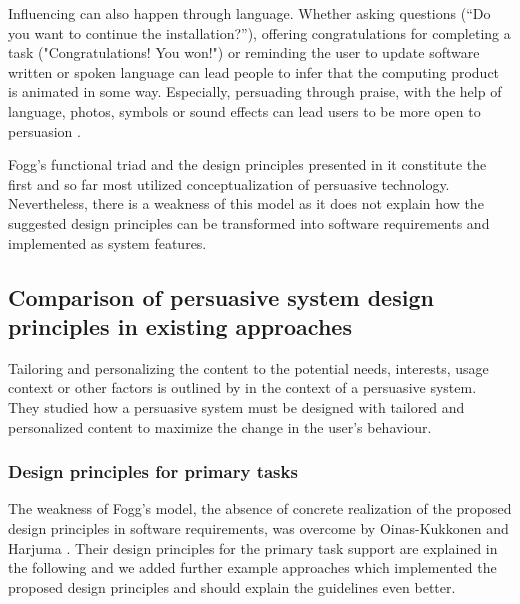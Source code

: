 Influencing can also happen through language. Whether asking questions
(“Do you want to continue the installation?”), offering congratulations for
completing a task ("Congratulations! You won!") or reminding the user to update software written or spoken language can lead people to infer that the computing product is animated in some way. Especially, persuading through praise, with the help of language, photos, symbols or sound effects can lead users to be more open to persuasion \cite{fogg2002persuasive}.

Fogg’s \cite{fogg2002persuasive} functional triad and the design principles presented in it constitute the first and so far most utilized conceptualization of persuasive technology. Nevertheless, there is a weakness of this model as it does not explain how the suggested design principles can be transformed into software requirements and implemented as system features.

\subsection{Comparison of persuasive system design principles in existing approaches}

Tailoring and personalizing the content to the potential needs, interests, usage context or other factors is outlined by \cite{oinas2009persuasive} in the context of a persuasive system. They studied how a persuasive system must be designed with tailored and personalized content to maximize the change in the user's behaviour. 

\subsubsection{Design principles for primary tasks}

The weakness of Fogg's model, the absence of concrete realization of the proposed design principles in software requirements, was overcome by Oinas-Kukkonen and Harjuma \cite{oinas2009persuasive}. Their design principles for the primary task support are explained in the following and we added further example approaches which implemented the proposed design principles and should explain the guidelines even better.

